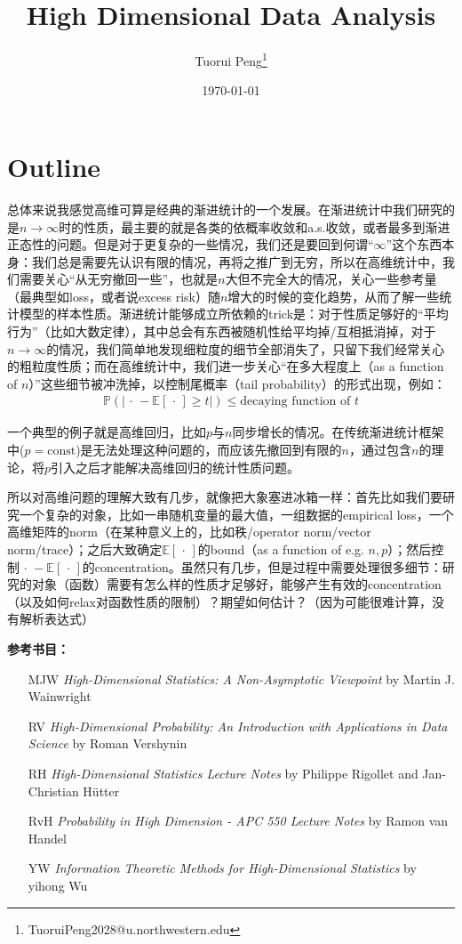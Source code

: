\documentclass[11pt,a4paper]{ctexart}
\title{High Dimensional Data Analysis}
\author{Tuorui Peng\footnote{TuoruiPeng2028@u.northwestern.edu}}
\date{\today}
\numberwithin{equation}{section}%
\begin{document}
    

\tableofcontents



\section{Outline}

总体来说我感觉高维可算是经典的渐进统计的一个发展。在渐进统计中我们研究的是$n\to\infty$时的性质，最主要的就是各类的依概率收敛和a.s.收敛，或者最多到渐进正态性的问题。但是对于更复杂的一些情况，我们还是要回到何谓“$\infty$”这个东西本身：我们总是需要先认识有限的情况，再将之推广到无穷，所以在高维统计中，我们需要关心“从无穷撤回一些”，也就是$n$大但不完全大的情况，关心一些参考量（最典型如loss，或者说excess risk）随$n$增大的时候的变化趋势，从而了解一些统计模型的样本性质。渐进统计能够成立所依赖的trick是：对于性质足够好的“平均行为”（比如大数定律），其中总会有东西被随机性给平均掉/互相抵消掉，对于$n\to\infty$的情况，我们简单地发现细粒度的细节全部消失了，只留下我们经常关心的粗粒度性质；而在高维统计中，我们进一步关心“在多大程度上（as a function of $n$）”这些细节被冲洗掉，以控制尾概率（tail probability）的形式出现，例如：
\begin{align*}
    \mathbb{P}\left( \left\vert \, \cdot \, -\mathbb{E}\left[ \, \cdot \,  \right] \geq t  \right\vert  \right) \leq \text{decaying function of }t
\end{align*}

一个典型的例子就是高维回归，比如$p$与$n$同步增长的情况。在传统渐进统计框架中($p=\mathrm{const}$)是无法处理这种问题的，而应该先撤回到有限的$n$，通过包含$n$的理论，将$p$引入之后才能解决高维回归的统计性质问题。

所以对高维问题的理解大致有几步，就像把大象塞进冰箱一样：首先比如我们要研究一个复杂的对象，比如一串随机变量的最大值，一组数据的empirical loss，一个高维矩阵的norm（在某种意义上的，比如秩/operator norm/vector norm/trace）；之后大致确定$ \mathbb{E}\left[ \, \cdot \,  \right]  $的bound（as a function of e.g. $ n,p $）；然后控制$ \, \cdot \, -\mathbb{E}\left[ \, \cdot \,  \right]  $的concentration。虽然只有几步，但是过程中需要处理很多细节：研究的对象（函数）需要有怎么样的性质才足够好，能够产生有效的concentration（以及如何relax对函数性质的限制）？期望如何估计？（因为可能很难计算，没有解析表达式）




\textbf{参考书目：}

\begin{itemize}[topsep=2pt,itemsep=0pt]
    \item[MJW] \textit{High-Dimensional Statistics: A Non-Asymptotic Viewpoint} by Martin J. Wainwright
    \item[RV] \textit{High-Dimensional Probability: An Introduction with Applications in Data Science} by Roman Vershynin
    \item[RH] \textit{High-Dimensional Statistics Lecture Notes} by Philippe Rigollet and Jan-Christian Hütter
    \item[RvH] \textit{Probability in High Dimension - APC 550 Lecture Notes} by Ramon van Handel
    \item[YW] \textit{Information Theoretic Methods for High-Dimensional Statistics} by yihong Wu
\end{itemize}
\end{document}

